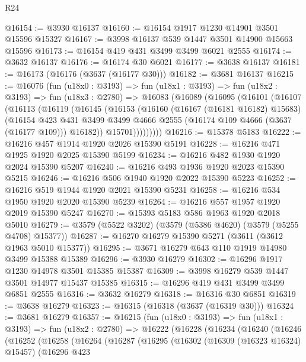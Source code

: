 \begin{lexlean}{R24}
\begin{coremodule}
@16154 := @3930 @16137
@16160 := @16154 @1917 @1230 @14901 @3501 @15596 @15327
@16167 := @3998 @16137 @539 @1447 @3501 @14900 @15663 @15596
@16173 := @16154 @419 @431 @3499 @3499 @6021 @2555
@16174 := @3632 @16137
@16176 := @16174 @30 @6021
@16177 := @3638 @16137
@16181 := @16173 (@16176 (@3637 (@16177 @30)))
@16182 := @3681 @16137
@16215 := @16076
    (fun (u18x0 : @3193) =>
    fun (u18x1 : @3193) =>
    fun (u18x2 : @3193) =>
    fun (u18x3 : @2780) =>
    @16083
      (@16089
        (@16095
          (@16101
            (@16107
              (@16113
                (@16119
                  (@16145
                    (@16153
                      (@16160
                        (@16167 (@16181 @16182) @15683)
                        (@16154
                          @423
                          @431
                          @3499
                          @3499
                          @4666
                          @2555
                          (@16174 @109 @4666 (@3637 (@16177 @109)))
                          @16182))
                      @15701)))))))))
@16216 := @15378 @5183
@16222 := @16216 @457 @1914 @1920 @2026 @15390 @5191
@16228 := @16216 @471 @1925 @1920 @2025 @15390 @5199
@16234 := @16216 @482 @1930 @1920 @2024 @15390 @5207
@16240 := @16216 @493 @1936 @1920 @2023 @15390 @5215
@16246 := @16216 @506 @1940 @1920 @2022 @15390 @5223
@16252 := @16216 @519 @1944 @1920 @2021 @15390 @5231
@16258 := @16216 @534 @1950 @1920 @2020 @15390 @5239
@16264 := @16216 @557 @1957 @1920 @2019 @15390 @5247
@16270 := @15393 @5183 @586 @1963 @1920 @2018 @5010
@16279 := @3579 (@5522 @3202) (@3579 (@5386 @4620) (@3579 (@5255 @4708) @15377))
@16287 := @16270 @16279 @15390 @5271 (@3611 (@3612 @1963 @5010 @15377))
@16295 := @3671 @16279 @643 @110 @1919 @14980 @3499 @15388 @15389
@16296 := @3930 @16279
@16302 := @16296 @1917 @1230 @14978 @3501 @15385 @15387
@16309 := @3998 @16279 @539 @1447 @3501 @14977 @15437 @15385
@16315 := @16296 @419 @431 @3499 @3499 @6851 @2555
@16316 := @3632 @16279
@16318 := @16316 @30 @6851
@16319 := @3638 @16279
@16323 := @16315 (@16318 (@3637 (@16319 @30)))
@16324 := @3681 @16279
@16357 := @16215
    (fun (u18x0 : @3193) =>
    fun (u18x1 : @3193) =>
    fun (u18x2 : @2780) =>
    @16222
      (@16228
        (@16234
          (@16240
            (@16246
              (@16252
                (@16258
                  (@16264
                    (@16287
                      (@16295
                        (@16302
                          (@16309 (@16323 @16324) @15457)
                          (@16296
                            @423

\end{coremodule}
\end{lexlean}
